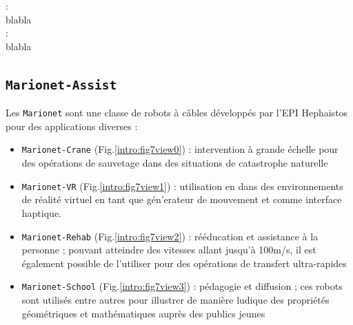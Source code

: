  :\\

blabla \\

 :\\

blabla \\


\subsection{{\tt Marionet-Assist}} \label{chap0-1-1}

Les {\tt Marionet} sont une classe de robots à câbles développés par l'EPI 
Hephaistos pour des applications diverses \cite{merlet2010marionet} :
\begin{itemize}
 \item {\tt Marionet-Crane} (Fig.\ref{intro:fig7view0}) : intervention à grande 
échelle pour des opé\-rations de sauvetage dans des situations de catastrophe 
naturelle
 \item {\tt Marionet-VR} (Fig.\ref{intro:fig7view1}) : utilisation en dans des 
environnements de r\'ealit\'e virtuel en tant que g\'en'erateur de mouvement et 
comme interface haptique. 
 \item {\tt Marionet-Rehab} (Fig.\ref{intro:fig7view2}) : rééducation et 
assistance à la personne ; pouvant atteindre des vitesses allant jusqu'à 
100m/s, 
il est également possible de l'utiliser pour des opérations de transfert 
ultra-rapides
 \item {\tt Marionet-School} (Fig.\ref{intro:fig7view3}) : pédagogie et 
diffusion ; ces robots sont utilisés entre autres pour illustrer de manière 
ludique des propriétés géométriques et mathématiques auprès des publics jeunes
\end{itemize}

